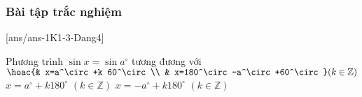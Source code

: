 \subsubsection{Bài tập trắc nghiệm}
[ans/ans-1K1-3-Dang4]
\begin{ex}%
	Phương trình $\sin x= \sin a^\circ$ tương đương với
	{\True $\hoac{& x=a^\circ+k 60^\circ \\ & x=180^\circ -a^\circ+60^\circ} (k \in \mathbb{Z})$}
	{$x=a^\circ+k180^\circ$ $ (k \in \mathbb{Z})$}
	{$x=-a^\circ+k180^\circ $ $(k \in \mathbb{Z})$}
\end{ex}


